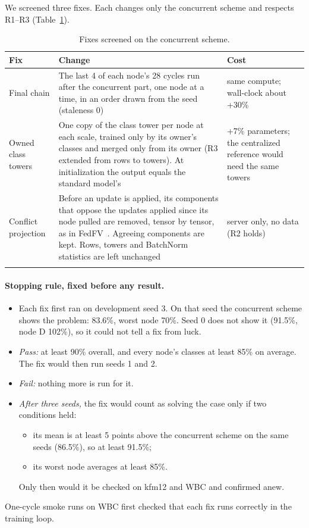 \documentclass[pdflatex,sn-mathphys-num]{sn-jnl}
\begin{document}
We screened three fixes. Each changes only the concurrent scheme and respects R1--R3 (Table~\ref{tab:s-fixes}).

\begin{table}[h]
\caption{Fixes screened on the concurrent scheme.}\label{tab:s-fixes}
\footnotesize
\begin{tabular*}{\textwidth}{@{\extracolsep\fill}>{\raggedright\arraybackslash}p{}>{\raggedright\arraybackslash}p{}>{\raggedright\arraybackslash}p{}}
\toprule
Fix & Change & Cost \\
\midrule
Final chain & The last 4 of each node's 28 cycles run after the concurrent part, one node at a time, in an order drawn from the seed (staleness 0) & same compute; wall-clock about +30\% \\
Owned class towers & One copy of the class tower per node at each scale, trained only by its owner's classes and merged only from its owner (R3 extended from rows to towers). At initialization the output equals the standard model's & +7\% parameters; the centralized reference would need the same towers \\
Conflict projection & Before an update is applied, its components that oppose the updates applied since its node pulled are removed, tensor by tensor, as in FedFV~\cite{wang2021fedfv}. Agreeing components are kept. Rows, towers and BatchNorm statistics are left unchanged & server only, no data (R2 holds) \\
\botrule
\end{tabular*}
\end{table}

\paragraph{Stopping rule, fixed before any result.}
\begin{itemize}
\item Each fix first ran on development seed 3. On that seed the concurrent scheme shows the problem: 83.6\%, worst node 70\%. Seed 0 does not show it (91.5\%, node D 102\%), so it could not tell a fix from luck.
\item \emph{Pass:} at least 90\% overall, and every node's classes at least 85\% on average. The fix would then run seeds 1 and 2.
\item \emph{Fail:} nothing more is run for it.
\item \emph{After three seeds,} the fix would count as solving the case only if two conditions held:
  \begin{itemize}
  \item its mean is at least 5 points above the concurrent scheme on the same seeds (86.5\%), so at least 91.5\%;
  \item its worst node averages at least 85\%.
  \end{itemize}
  Only then would it be checked on kfm12 and WBC and confirmed anew.
\end{itemize}
One-cycle smoke runs on WBC first checked that each fix runs correctly in the training loop.
\end{document}
